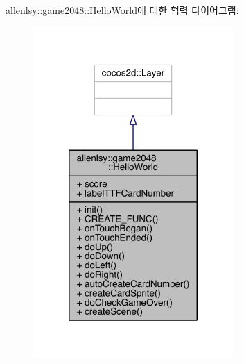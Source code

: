 allenlsy\+:\+:game2048\+:\+:Hello\+World에 대한 협력 다이어그램\+:
\nopagebreak
\begin{figure}[H]
\begin{center}
\leavevmode
\includegraphics[width=216pt]{classallenlsy_1_1game2048_1_1_hello_world__coll__graph}
\end{center}
\end{figure}
